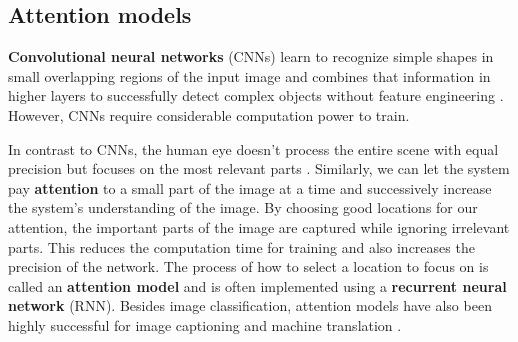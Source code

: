 


\subsection{Attention models}





\textbf{Convolutional neural networks} (CNNs) learn to recognize simple shapes in small overlapping regions of the input image and combines that information in higher layers to successfully detect complex objects without feature engineering \cite{DeepMindAttention}.
However, CNNs require considerable computation power to train.

In contrast to CNNs, the human eye doesn't process the entire scene with equal precision but focuses on the most relevant parts \cite{DeepMindAttention}.
Similarly, we can let the system pay \textbf{attention} to a small part of the image at a time and successively increase the system's understanding of the image.
By choosing good locations for our attention, the important parts of the image are captured while ignoring irrelevant parts.
This reduces the computation time for training and also increases the precision of the network. The process of how to select a location to focus on is called an \textbf{attention model} and is often implemented using a \textbf{recurrent neural network} (RNN). Besides image classification, attention models have also been highly successful for image captioning \cite{AttendAndTell} and machine translation \cite{machine_translation_attention}.

